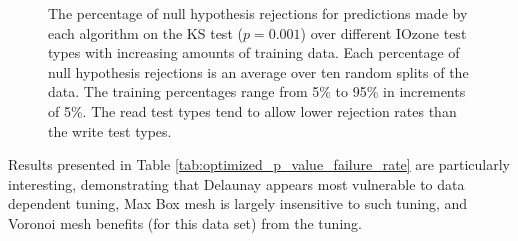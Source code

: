 \begin{figure}
  \centering
  \caption{The percentage of null hypothesis rejections for predictions made by each algorithm on the KS test ($p=0.001$) over different IOzone test types with increasing amounts of training data. Each percentage of null hypothesis rejections is an average over ten random splits of the data. The training percentages range from 5\% to 95\% in increments of 5\%. The read test types tend to allow lower rejection rates than the write test types.}
  \label{fig:ks_failure_by_training_and_test}
\end{figure}


Results presented in Table \ref{tab:optimized_p_value_failure_rate} are particularly interesting, demonstrating that Delaunay appears most vulnerable to data dependent tuning, Max Box mesh is largely insensitive to such tuning, and Voronoi mesh benefits (for this data set) from the tuning.

